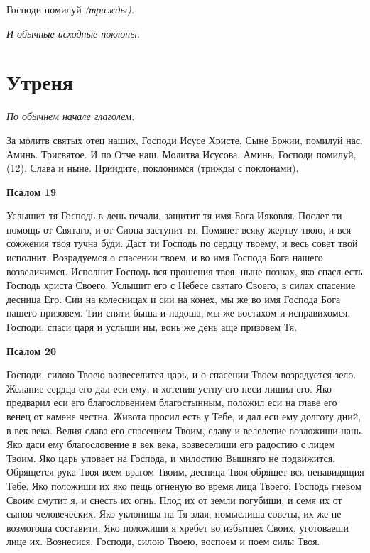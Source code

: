 Господи помилуй \itshape (трижды)\normalfont{}.


\itshape И обычные исходные поклоны.\normalfont{}




\section{Утреня}
 


\itshape По обычнем начале глаголем:\normalfont{}


За молитв святых отец наших, Господи Исусе Христе, Сыне Божии, помилуй нас. Аминь. Трисвятое. И по Отче наш. Молитва Исусова. Аминь. Господи помилуй, (12). Слава и ныне. Приидите, поклонимся (трижды с поклонами).





\bfseries Псалом 19\normalfont{}


Услышит тя Господь в день печали, защитит тя имя Бога Ияковля. Послет ти помощь от Святаго, и от Сиона заступит тя. Помянет всяку жертву твою, и вся сожжения твоя тучна буди. Даст ти Господь по сердцу твоему, и весь совет твой исполнит. Возрадуемся о спасении твоем, и во имя Господа Бога нашего возвеличимся. Исполнит Господь вся прошения твоя, ныне познах, яко спасл есть Господь христа Своего. Услышит его с Небесе святаго Своего, в силах спасение десница Его. Сии на колесницах и сии на конех, мы же во имя Господа Бога нашего призовем. Тии спяти быша и падоша, мы же востахом и исправихомся. Господи, спаси царя и услыши ны, вонь же день аще призовем Тя.





\bfseries Псалом 20\normalfont{}


Господи, силою Твоею возвеселится царь, и о спасении Твоем возрадуется зело. Желание сердца его дал еси ему, и хотения устну его неси лишил его. Яко предварил еси его благословением благостынным, положил еси на главе его венец от камене честна. Живота просил есть у Тебе, и дал еси ему долготу дний, в век века. Велия слава его спасением Твоим, славу и велелепие возложиши нань. Яко даси ему благословение в век века, возвеселиши его радостию с лицем Твоим. Яко царь уповает на Господа, и милостию Вышняго не подвижится. Обрящется рука Твоя всем врагом Твоим, десница Твоя обрящет вся ненавидящия Тебе. Яко положиши их яко пещь огненую во время лица Твоего, Господь гневом Своим смутит я, и снесть их огнь. Плод их от земли погубиши, и семя их от сынов человеческих. Яко уклониша на Тя злая, помыслиша советы, их же не возмогоша составити. Яко положиши я хребет во избытцех Своих, уготоваеши лице их. Вознесися, Господи, силою Твоею, воспоем и поем силы Твоя.


